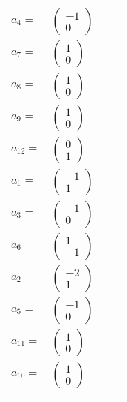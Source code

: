 \documentclass[1p]{elsarticle_modified}
\theoremstyle{definition}
\begin{document}
\begin{tabular}{m{7pt} m{180pt} m{7pt} m{180pt} }
\flushright $a_{4}=$&$\begin{pmatrix}-1\\0\end{pmatrix}$ \\
\flushright $a_{7}=$&$\begin{pmatrix}1\\0\end{pmatrix}$ \\
\flushright $a_{8}=$&$\begin{pmatrix}1\\0\end{pmatrix}$ \\
\flushright $a_{9}=$&$\begin{pmatrix}1\\0\end{pmatrix}$ \\
\flushright $a_{12}=$&$\begin{pmatrix}0\\1\end{pmatrix}$ \\
\flushright $a_{1}=$&$\begin{pmatrix}-1\\1\end{pmatrix}$ \\
\flushright $a_{3}=$&$\begin{pmatrix}-1\\0\end{pmatrix}$ \\
\flushright $a_{6}=$&$\begin{pmatrix}1\\-1\end{pmatrix}$ \\
\flushright $a_{2}=$&$\begin{pmatrix}-2\\1\end{pmatrix}$ \\
\flushright $a_{5}=$&$\begin{pmatrix}-1\\0\end{pmatrix}$ \\
\flushright $a_{11}=$&$\begin{pmatrix}1\\0\end{pmatrix}$ \\
\flushright $a_{10}=$&$\begin{pmatrix}1\\0\end{pmatrix}$\\&\end{tabular}
\end{document}
